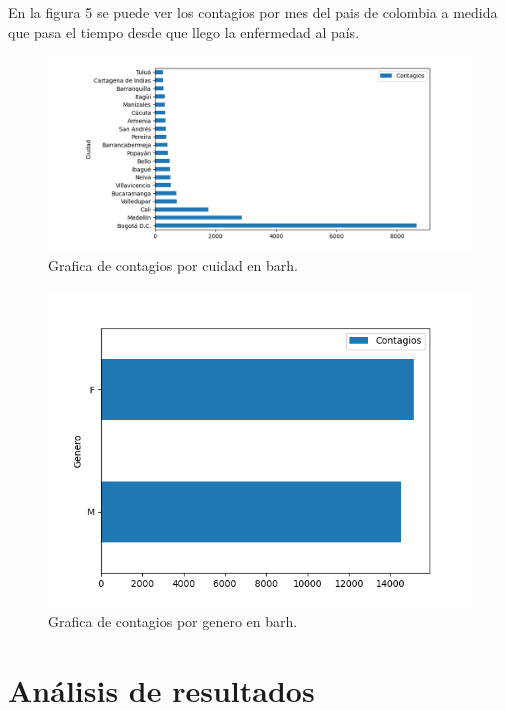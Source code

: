 \documentclass[conference,compsoc,onecolumn]{IEEEtran}
\begin{document}
En la figura 5 se puede ver los contagios por mes del pais de colombia a medida que pasa el tiempo desde que llego la enfermedad al país.\\

\begin{figure}[h!]
    \centering
    \includegraphics[scale=0.4]{images/Contagios_ciudad_barh.png}
    \caption{Grafica de contagios por cuidad en barh.}
    \label{fig:fig1}
\end{figure}

\begin{figure}[h!]
    \centering
    \includegraphics[scale=0.4]{images/Contagios_genero_barh.png}
    \caption{Grafica de contagios por genero en barh.}
    \label{fig:fig1}
\end{figure}



\section{Análisis de resultados}
\end{document}
